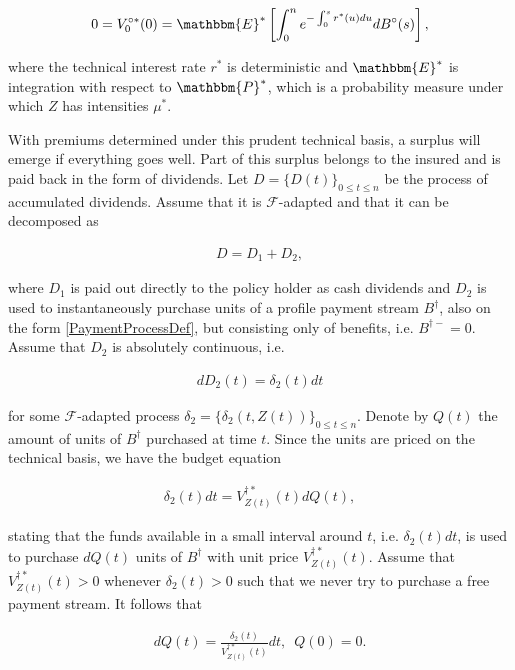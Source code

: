 \documentclass{article}
\newcommand{\1}[1]{\mathbbm{1}_{\left\lbrace #1 \right\rbrace}}
\newcommand{\expecStar}[1][def]{\mathbbm{E}^* \left[ #1 \right]}
\theoremstyle{break}
\theoremstyle{remark}
\numberwithin{equation}{section}
\begin{document}
\begin{align*}
0 = V_0^{\circ*}(0) = \expecStar[\int_0^n e^{-\int_0^s r^*(u) du} dB^\circ(s)],
\end{align*}

where the technical interest rate $r^*$ is deterministic and $\mathbbm{E}^*$ is integration with respect to $\mathbbm{P}^*$, which is a probability measure under which $Z$ has intensities $\mu^*$.

With premiums determined under this prudent technical basis, a surplus will emerge if everything goes well. Part of this surplus belongs to the insured and is paid back in the form of dividends. Let $D = \{ D(t) \}_{0 \leq t \leq n}$ be the process of accumulated dividends. Assume that it is $\mathcal{F}$-adapted and that it can be decomposed as

\begin{align*}
D = D_1 + D_2,
\end{align*}

where $D_1$ is paid out directly to the policy holder as cash dividends and $D_2$ is used to instantaneously purchase units of a profile payment stream $B^\dagger$, also on the form \ref{PaymentProcessDef}, but consisting only of benefits, i.e. $B^{\dagger -}=0$. Assume that $D_2$ is absolutely continuous, i.e.

\begin{align*}
dD_2(t) = \delta_2(t) dt
\end{align*}

for some $\mathcal{F}$-adapted process $\delta_2 = \{ \delta_2(t,Z(t)) \}_{0 \leq t \leq n}$. Denote by $Q(t)$ the amount of units of $B^\dagger$ purchased at time $t$. Since the units are priced on the technical basis, we have the budget equation

\begin{align*}
\delta_2(t) dt = V_{Z(t)}^{\dagger*}(t) dQ(t),
\end{align*}

stating that the funds available in a small interval around $t$, i.e. $\delta_2(t) dt$, is used to purchase $dQ(t)$ units of $B^\dagger$ with unit price $V_{Z(t)}^{\dagger*}(t)$. Assume that $V_{Z(t)}^{\dagger*}(t)>0$ whenever $\delta_2(t)>0$ such that we never try to purchase a free payment stream. It follows that

\begin{align} \label{QDynamics}
dQ(t) = \frac{\delta_2(t)}{V_{Z(t)}^{\dagger*}(t)}  dt, \, \, \, Q(0)=0.
\end{align}
\end{document}
